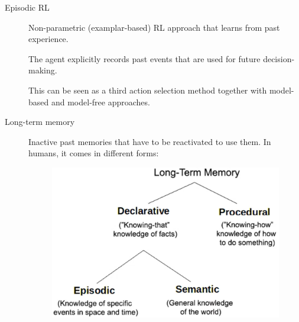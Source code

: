 \begin{description}
    \item[Episodic RL] 
        Non-parametric (examplar-based) RL approach that learns from past experience.

        The agent explicitly records past events that are used for future decision-making.

        \begin{remark}
            This can be seen as a third action selection method together with model-based and model-free approaches.
        \end{remark}

    \item[Long-term memory] 
        Inactive past memories that have to be reactivated to use them. In humans, it comes in different forms:

        \begin{figure}[H]
            \centering
            \includegraphics[width=0.35\linewidth]{./img/long_term_memory.png}
        \end{figure}


\end{description}
